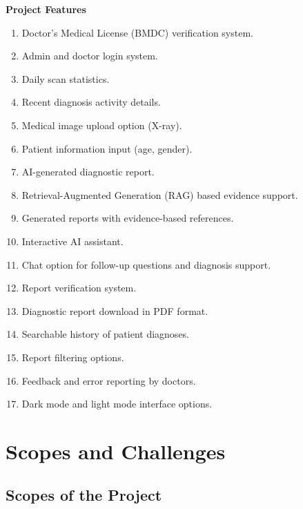 \textbf{Project Features}

\begin{enumerate}
    \item Doctor’s Medical License (BMDC) verification system.
    \item Admin and doctor login system.
    \item Daily scan statistics.
    \item Recent diagnosis activity details.
    \item Medical image upload option (X-ray).
    \item Patient information input (age, gender).
    \item AI-generated diagnostic report.
    \item Retrieval-Augmented Generation (RAG) based evidence support.
    \item Generated reports with evidence-based references.
    \item Interactive AI assistant.
    \item Chat option for follow-up questions and diagnosis support.
    \item Report verification system.
    \item Diagnostic report download in PDF format.
    \item Searchable history of patient diagnoses.
    \item Report filtering options.
    \item Feedback and error reporting by doctors.
    \item Dark mode and light mode interface options.
\end{enumerate}
\section{Scopes and Challenges}
\subsection{Scopes of the Project}

